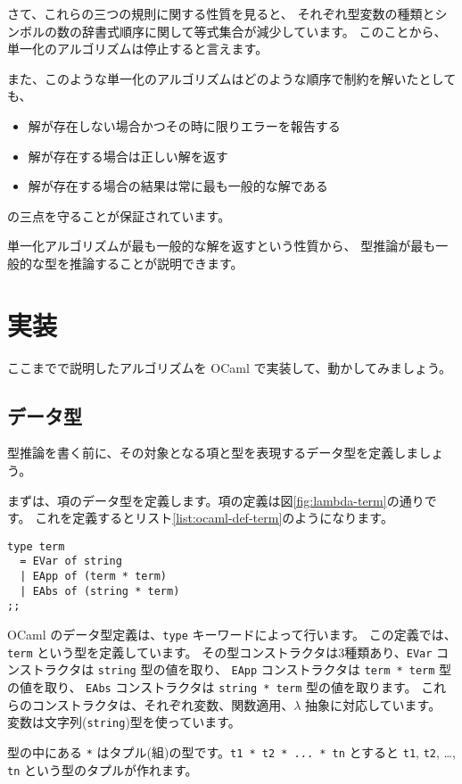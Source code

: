 さて、これらの三つの規則に関する性質を見ると、
それぞれ型変数の種類とシンボルの数の辞書式順序に関して等式集合が減少しています。
このことから、単一化のアルゴリズムは停止すると言えます。

また、このような単一化のアルゴリズムはどのような順序で制約を解いたとしても、
\begin{itemize}
  \item 解が存在しない場合かつその時に限りエラーを報告する
  \item 解が存在する場合は正しい解を返す
  \item 解が存在する場合の結果は常に最も一般的な解である
\end{itemize}
の三点を守ることが保証されています。

単一化アルゴリズムが最も一般的な解を返すという性質から、
型推論が最も一般的な型を推論することが説明できます。

\section{実装}

ここまでで説明したアルゴリズムを OCaml で実装して、動かしてみましょう。

\subsection{データ型}

型推論を書く前に、その対象となる項と型を表現するデータ型を定義しましょう。

まずは、項のデータ型を定義します。項の定義は図\ref{fig:lambda-term}の通りです。
これを定義するとリスト\ref{list:ocaml-def-term}のようになります。

\begin{lstlisting}[caption=項の定義, label=list:ocaml-def-term]
type term
  = EVar of string
  | EApp of (term * term)
  | EAbs of (string * term)
;;
\end{lstlisting}

OCaml のデータ型定義は、\texttt{type} キーワードによって行います。
この定義では、\texttt{term} という型を定義しています。
その型コンストラクタは3種類あり、\texttt{EVar} コンストラクタは \texttt{string} 型の値を取り、
\texttt{EApp} コンストラクタは \texttt{term * term} 型の値を取り、
\texttt{EAbs} コンストラクタは \texttt{string * term} 型の値を取ります。
これらのコンストラクタは、それぞれ変数、関数適用、$\lambda$ 抽象に対応しています。
変数は文字列(\texttt{string})型を使っています。

型の中にある \texttt{*} はタプル(組)の型です。\texttt{t1 * t2 * ... * tn} とすると
\texttt{t1}, \texttt{t2}, \dots, \texttt{tn} という型のタプルが作れます。

